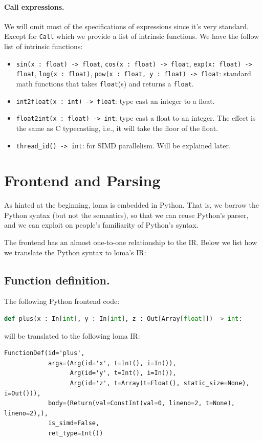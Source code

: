 \paragraph{Call expressions.}
We will omit most of the specifications of expressions since it's very standard. Except for \lstinline{Call} which we provide a list of intrinsic functions. We have the follow list of intrinsic functions:

\begin{itemize}
\item \lstinline{sin(x : float) -> float}, \lstinline{cos(x : float) -> float}, \lstinline{exp(x: float) -> float}, \lstinline{log(x : float)}, \lstinline{pow(x : float, y : float) -> float}: standard math functions that takes \lstinline{float}(s) and returns a \lstinline{float}.
\item \lstinline{int2float(x : int) -> float}: type cast an integer to a float.
\item \lstinline{float2int(x : float) -> int}: type cast a float to an integer. The effect is the same as C typecasting, i.e., it will take the floor of the float.
\item \lstinline{thread_id() -> int}: for SIMD parallelism. Will be explained later.
\end{itemize}

\section{Frontend and Parsing}
As hinted at the beginning, loma is embedded in Python. That is, we borrow the Python syntax (but not the semantics), so that we can reuse Python's parser, and we can exploit on people's familiarity of Python's syntax. 

The frontend has an almost one-to-one relationship to the IR. Below we list how we translate the Python syntax to loma's IR: 

\subsection{Function definition.} 
The following Python frontend code:
\begin{lstlisting}[language=Python]
def plus(x : In[int], y : In[int], z : Out[Array[float]]) -> int:
\end{lstlisting}
will be translated to the following loma IR:
\begin{lstlisting}
FunctionDef(id='plus',
            args=(Arg(id='x', t=Int(), i=In()),
                  Arg(id='y', t=Int(), i=In()),
                  Arg(id='z', t=Array(t=Float(), static_size=None), i=Out())),
            body=(Return(val=ConstInt(val=0, lineno=2, t=None), lineno=2),),
            is_simd=False,
            ret_type=Int())
\end{lstlisting}

